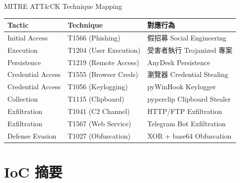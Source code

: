 \documentclass{beamer}
\begin{document}
\begin{frame}{MITRE ATT\&CK Technique Mapping}
  \begin{small}
  \begin{tabular}{lll}
    \toprule
    \textbf{Tactic} & \textbf{Technique} & \textbf{對應行為} \\
    \midrule
    Initial Access & T1566 (Phishing) & 假招募 Social Engineering \\
    Execution & T1204 (User Execution) & 受害者執行 Trojanized 專案 \\
    Persistence & T1219 (Remote Access) & AnyDesk Persistence \\
    Credential Access & T1555 (Browser Creds) & 瀏覽器 Credential Stealing \\
    Credential Access & T1056 (Keylogging) & pyWinHook Keylogger \\
    Collection & T1115 (Clipboard) & pyperclip Clipboard Stealer \\
    Exfiltration & T1041 (C2 Channel) & HTTP/FTP Exfiltration \\
    Exfiltration & T1567 (Web Service) & Telegram Bot Exfiltration \\
    Defense Evasion & T1027 (Obfuscation) & XOR + base64 Obfuscation \\
    \bottomrule
  \end{tabular}
  \end{small}
\end{frame}

\section{IoC 摘要}
\end{document}
